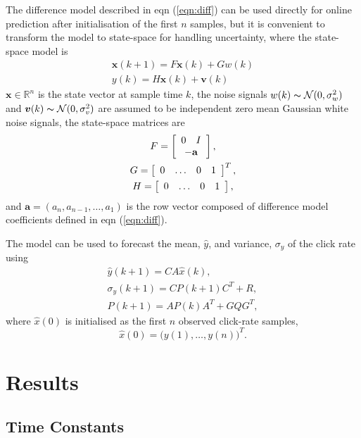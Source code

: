 \documentclass{article}
\begin{document}
The difference model described in eqn (\ref{eqn:diff}) can be used directly for online prediction after initialisation of the first $n$ samples, but it is convenient to transform the model to state-space for handling uncertainty, where the state-space model is
\begin{gather}
\mathbf{x}(k+1) = F \mathbf{x}(k) + G w(k) \\
y(k) = H \mathbf{x}(k)+ \boldsymbol{v}(k)
\end{gather} 
$\mathbf{x}  \in \mathbb{R}^{n}$ is the state vector at sample time $k$, the noise signals  $w(k) \thicksim \mathcal{N}(0,\sigma_w^{2})$ and $\boldsymbol{v}(k) \thicksim \mathcal{N}(0,\sigma_v^{2})$ are assumed to be independent zero mean Gaussian white noise signals, the state-space matrices are
 \begin{gather}    
F= \left[ \begin{array}{ccc}
0 & I \\
\multicolumn{2}{c}{-\mathbf{a}}  
\end{array} \right] , \\
G = \left[ \begin{array}{cccc}
0 & \ldots & 0 & 1	
\end{array} \right]^{T} , \\
H = \left[ \begin{array}{cccc}
0 & \ldots & 0 & 1	
\end{array} \right] , 
\end{gather}
and $\mathbf{a} = (a_n,a_{n-1},\ldots, a_1)$ is the row vector composed of difference model coefficients defined in eqn (\ref{eqn:diff}).

The model can be used to forecast the mean, $\hat{y}$, and variance, $\sigma_y$ of the click rate using
\begin{gather}
\hat{y}(k+1) = C A \hat{x}(k) ,  \\
\sigma_y(k+1) = C  P(k+1) C^{T} + R  ,  \\
P(k+1) = A P(k) A^{T}+ G Q G^{T} , 
\end{gather}
where  $\hat{x}(0)$ is initialised as the first $n$ observed click-rate samples,
\begin{equation}
\hat{x}(0) = \bigl(y(1), \ldots, y(n) \bigr)^{T} .
\end{equation}
    
    \section{Results}
    
    
    
    \subsection{Time Constants}
    
    
    
\end{document}
